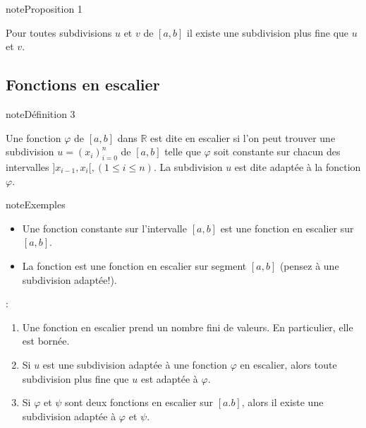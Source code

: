 \documentclass[letterpaper,10pt,french]{sphinxmanual}
\begin{document}
\begin{sphinxadmonition}{note}{Proposition 1}

\sphinxAtStartPar
Pour toutes subdivisions \(u\) et \(v\) de \([a, b]\) il existe une subdivision plus fine que  \(u\) et \(v\).
\end{sphinxadmonition}


\subsection{Fonctions en escalier}
\label{\detokenize{fe:fonctions-en-escalier}}
\begin{sphinxadmonition}{note}{Définition 3}

\sphinxAtStartPar
Une fonction \(\varphi\) de \([a,b]\) dans \(\mathbb{R}\) est dite en escalier si l’on peut trouver une subdivision \(u=(x_i)_{i=0}^n\) de \([a, b]\) telle que \(\varphi\) soit constante sur chacun des intervalles \(]x_{i-1}, x_i[, (1\leq i \leq n)\).
La subdivision \(u\) est dite adaptée à la fonction \(\varphi\).
\end{sphinxadmonition}

\begin{sphinxadmonition}{note}{Exemples}
\begin{itemize}
\item {} 
\sphinxAtStartPar
Une fonction constante sur l’intervalle \([a,b]\) est une fonction en escalier sur \([a,b]\).

\item {} 
\sphinxAtStartPar
La fonction  est une fonction en escalier sur segment \([a,b]\) (pensez à une subdivision adaptée!).

\end{itemize}
\end{sphinxadmonition}

\sphinxAtStartPar
{}:
\begin{enumerate}
%
\item {} 
\sphinxAtStartPar
Une fonction en escalier prend un nombre fini de valeurs. En particulier, elle est bornée.

\item {} 
\sphinxAtStartPar
Si \(u\) est une subdivision adaptée à une fonction \(\varphi\) en escalier, alors toute subdivision plus fine que \(u\) est adaptée à \(\varphi\).

\item {} 
\sphinxAtStartPar
Si \(\varphi\) et \(\psi\) sont deux fonctions en escalier sur \([a. b]\), alors il existe une subdivision adaptée à \(\varphi\) et \(\psi\).

\end{enumerate}
\end{document}

